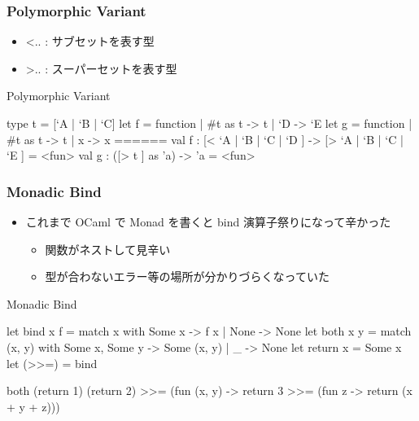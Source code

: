 \documentclass[dvipdfmx,14pt,notheorems,aspectratio=169]{beamer}
\theoremstyle{definition}
\begin{document}
    \begin{frame}[fragile]\frametitle{Polymorphic Variant}
        \begin{itemize}
            \item \lbrack \textless .. \rbrack : サブセットを表す型
            \item \lbrack \textgreater .. \rbrack : スーパーセットを表す型
        \end{itemize}
        \begin{exampleblock}{Polymorphic Variant}
            \scriptsize
            \begin{verbatimtab}
type t = [`A | `B | `C]
let f = function
    | #t as t -> t
    | `D -> `E
let g = function
    | #t as t -> t
    | x -> x
======
val f : [< `A | `B | `C | `D ] -> [> `A | `B | `C | `E ] = <fun>
val g : ([> t ] as 'a) -> 'a = <fun>
\end{verbatimtab}
        \end{exampleblock}
    \end{frame}

\begin{frame}[fragile]\frametitle{Monadic Bind}
    \begin{itemize}
        \item これまで OCaml で Monad を書くと bind 演算子祭りになって辛かった
        \begin{itemize}
            \item 関数がネストして見辛い
            \item 型が合わないエラー等の場所が分かりづらくなっていた
        \end{itemize}
    \end{itemize}
    \begin{exampleblock}{Monadic Bind}
        \scriptsize
        \begin{verbatimtab}
let bind x f = match x with Some x -> f x | None -> None
let both x y = match (x, y) with Some x, Some y -> Some (x, y) | _ -> None
let return x = Some x
let (>>=) = bind

both (return 1) (return 2) >>= (fun (x, y) ->
return 3 >>= (fun z ->
return (x + y + z)))\end{verbatimtab}
    \end{exampleblock}
\end{frame}
\end{document}
